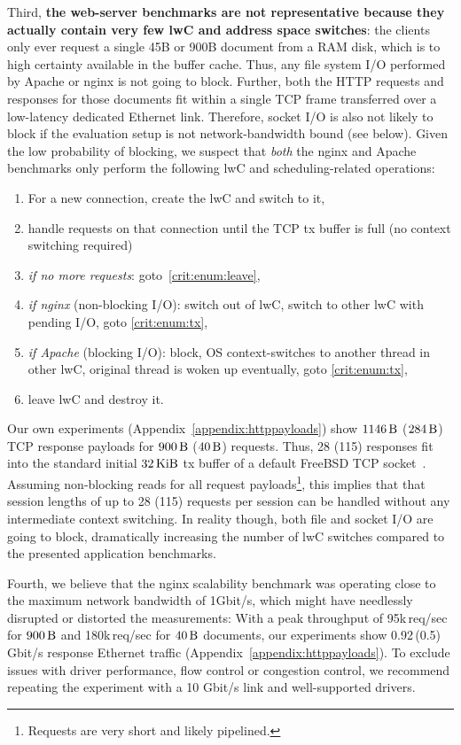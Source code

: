 \documentclass[10pt,twocolumn,a4paper]{article}
\begin{document}
Third, \textbf{the web-server benchmarks are not representative because they actually contain very few lwC and address space switches}:
the clients only ever request a single 45B or 900B document from a RAM disk, which is to high certainty available in the buffer cache.
Thus, any file system I/O performed by Apache or nginx is not going to block.
Further, both the HTTP requests and responses for those documents fit within a single TCP frame transferred over a low-latency dedicated Ethernet link.
Therefore, socket I/O is also not likely to block if the evaluation setup is not network-bandwidth bound (see below).
Given the low probability of blocking, we suspect that \textit{both} the nginx and Apache benchmarks only perform the following lwC and scheduling-related operations:
\begin{enumerate}[nosep]
\item For a new connection, create the lwC and switch to it,
\item\label{crit:enum:tx} handle requests on that connection until the TCP tx buffer is full (no context switching required)
\item \textit{if no more requests}: goto~\ref{crit:enum:leave},
\item \textit{if nginx} (non-blocking I/O): switch out of lwC, switch to other lwC with pending I/O, goto \ref{crit:enum:tx},
\item \textit{if Apache} (blocking I/O): block, OS context-switches to another thread in other lwC, original thread is woken up eventually, goto \ref{crit:enum:tx},
\item\label{crit:enum:leave} leave lwC and destroy it.
\end{enumerate}
Our own experiments (Appendix~\ref{appendix:httppayloads}) show $\SI{1146}{\byte}$ ($\SI{284}{\byte}$) TCP response payloads for $\SI{900}{\byte}$ ($\SI{40}{\byte}$) requests.
Thus, 28 (115) responses fit into the standard initial $\SI{32}{\kibi\byte}$ tx buffer of a default FreeBSD TCP socket~\cite{fbsd11tcpsendspace}.
Assuming non-blocking reads for all request payloads\footnote{Requests are very short and likely pipelined.}, this implies that that session lengths of up to 28 (115) requests per session can be handled without any intermediate context switching.
In reality though, both file and socket I/O are going to block, dramatically increasing the number of lwC switches compared to the presented application benchmarks.

Fourth, we believe that the nginx scalability benchmark was operating close to the maximum network bandwidth of 1Gbit/s, which might have needlessly disrupted or distorted the measurements:
With a peak throughput of 95k\,req/sec for $\SI{900}{\byte}$ and 180k\,req/sec for $\SI{40}{\byte}$ documents, our experiments show 0.92\,(0.5)\,Gbit/s response Ethernet traffic (Appendix~\ref{appendix:httppayloads}).
To exclude issues with driver performance, flow control or congestion control, we recommend repeating the experiment with a 10 Gbit/s link and well-supported drivers.
\end{document}
